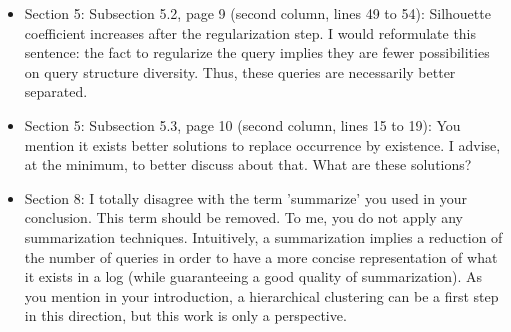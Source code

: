 \begin{itemize}

\item  Section 5: Subsection 5.2, page 9 (second column, lines 49 to 54):  Silhouette coefficient increases after the regularization step. I would reformulate this sentence: the fact to regularize the query implies they are fewer possibilities on query structure diversity. Thus, these queries are necessarily better separated.


\item  Section 5: Subsection 5.3, page 10 (second column, lines 15 to 19): You mention it exists better solutions to replace occurrence by existence. I advise, at the minimum, to better discuss about that. What are these solutions?


\item Section 8: I totally disagree with the term 'summarize' you used in your conclusion. This term should be removed. To me, you do not apply any summarization techniques. Intuitively, a summarization implies a reduction of the number of queries in order to have a more concise representation of what it exists in a log (while guaranteeing a good quality of summarization). As you mention in your introduction, a hierarchical clustering can be a first step in this direction, but this work is only a perspective.


\end{itemize}



